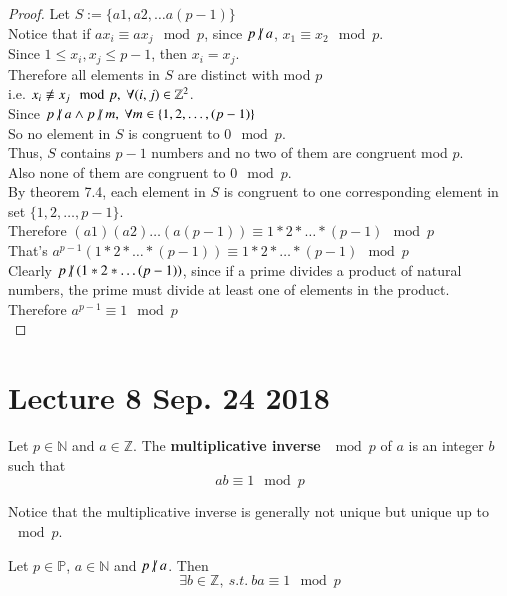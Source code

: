 \documentclass[11pt]{article}
\begin{document}
	\begin{proof}
		Let $S := \{a1, a2, \dots a(p-1)\}$ \\
		Notice that if $ax_i \equiv ax_j \mod p$, since $p \centernot | a$, $x_1 \equiv x_2 \mod p$. \\
		Since $1 \leq x_i, x_j \leq p-1$, then $x_i = x_j$. \\
		Therefore all elements in $S$ are distinct with mod $p$ \\
		i.e. $x_i \centernot \equiv x_j \mod p,\ \forall (i,j) \in \mathbb{Z}^2$. \\
		Since $p \centernot | a \land p \centernot | m,\ \forall m \in \{1, 2, \dots, (p-1)\}$ \\
		So no element in $S$ is congruent to $0 \mod p$. \\
		Thus, $S$ contains $p-1$ numbers and no two of them are congruent mod $p$. \\
		Also none of them are congruent to $0 \mod p$. \\
		By theorem 7.4, each element in $S$ is congruent to one corresponding element in set $\{1,2,\dots, p-1\}$. \\
		Therefore $(a1)(a2)\dots(a(p-1)) \equiv 1*2*\dots*(p-1) \mod p$ \\
		That's $a^{p-1}(1*2* \dots *(p-1)) \equiv 1*2*\dots*(p-1) \mod p$ \\
		Clearly $p \centernot | (1*2*\dots (p-1))$, since if a prime divides a product of natural numbers, the prime must divide at least one of elements in the product. \\
		Therefore $a^{p-1} \equiv 1 \mod p$ \\
	\end{proof}
	
	\section{Lecture 8 Sep. 24 2018}
	\begin{definition}
		Let $p \in \mathbb{N}$ and $a \in \mathbb{Z}$. The \textbf{multiplicative inverse} $\mod p$ of $a$ is an integer $b$ such that
		\[
			ab \equiv 1 \mod p
		\]
	\end{definition}
	\begin{remark}
		Notice that the multiplicative inverse is generally not unique but unique up to $\mod p$.		
	\end{remark}
	
	\begin{corollary}
		Let $p \in \mathbb{P}$, $a \in \mathbb{N}$ and $p \centernot | a$. Then 
		\[
			\exists b \in \mathbb{Z},\ s.t.\ ba \equiv 1 \mod p
		\]
	\end{corollary}
	
\end{document}
